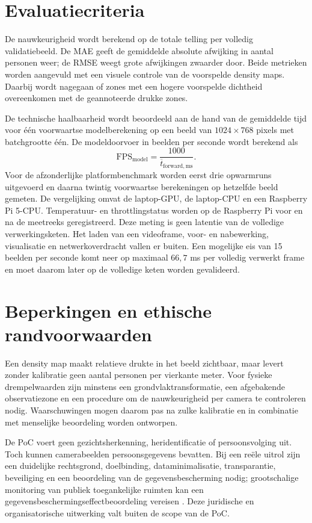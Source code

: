 \section{Evaluatiecriteria}

De nauwkeurigheid wordt berekend op de totale telling per volledig validatiebeeld. De MAE geeft de gemiddelde absolute afwijking in aantal personen weer; de RMSE weegt grote afwijkingen zwaarder door. Beide metrieken worden aangevuld met een visuele controle van de voorspelde density maps. Daarbij wordt nagegaan of zones met een hogere voorspelde dichtheid overeenkomen met de geannoteerde drukke zones.

De technische haalbaarheid wordt beoordeeld aan de hand van de gemiddelde tijd voor één voorwaartse modelberekening op een beeld van \(1024 \times 768\) pixels met batchgrootte één. De modeldoorvoer in beelden per seconde wordt berekend als
\[
    \mathrm{FPS}_{\mathrm{model}} = \frac{1000}{\overline{t}_{\mathrm{forward,ms}}}.
\]
Voor de afzonderlijke platformbenchmark worden eerst drie opwarmruns uitgevoerd en daarna twintig voorwaartse berekeningen op hetzelfde beeld gemeten. De vergelijking omvat de laptop-GPU, de laptop-CPU en een Raspberry Pi 5-CPU. Temperatuur- en throttlingstatus worden op de Raspberry Pi voor en na de meetreeks geregistreerd. Deze meting is geen latentie van de volledige verwerkingsketen. Het laden van een videoframe, voor- en nabewerking, visualisatie en netwerkoverdracht vallen er buiten. Een mogelijke eis van 15 beelden per seconde komt neer op maximaal \(66{,}7\) ms per volledig verwerkt frame en moet daarom later op de volledige keten worden gevalideerd.

\section{Beperkingen en ethische randvoorwaarden}

Een density map maakt relatieve drukte in het beeld zichtbaar, maar levert zonder kalibratie geen aantal personen per vierkante meter. Voor fysieke drempelwaarden zijn minstens een grondvlaktransformatie, een afgebakende observatiezone en een procedure om de nauwkeurigheid per camera te controleren nodig. Waarschuwingen mogen daarom pas na zulke kalibratie en in combinatie met menselijke beoordeling worden ontworpen.

De PoC voert geen gezichtsherkenning, heridentificatie of persoonsvolging uit. Toch kunnen camerabeelden persoonsgegevens bevatten. Bij een reële uitrol zijn een duidelijke rechtsgrond, doelbinding, dataminimalisatie, transparantie, beveiliging en een beoordeling van de gegevensbescherming nodig; grootschalige monitoring van publiek toegankelijke ruimten kan een gegevensbeschermingseffectbeoordeling vereisen \autocite{EDPBVideo2020}. Deze juridische en organisatorische uitwerking valt buiten de scope van de PoC.

